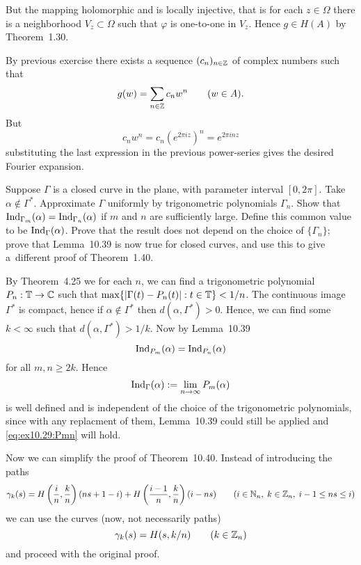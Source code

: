 \begin{enumerate}
But the mapping holomorphic and 
is locally injective, that is for each \(z\in\Omega\)
there is a neighborhood \(V_z\subset\Omega\) such that \(\varphi\)
is one-to-one in \(V_z\).
Hence \(g\in H(A)\) by Theorem~1.30.

By previous exercise there exists a sequence \((c_n)_{n\in\mathbb{Z}}\)
of complex numbers such that 
\begin{equation*}
g(w) = \sum_{n\in\mathbb{Z}} c_n w^n \qquad (w\in A).
\end{equation*}
But
\begin{equation*}
c_nw^n = c_n  \left(e^{2\pi i z}\right)^n = e^{2\pi i nz}
\end{equation*}
substituting the last expression in the previous power-series gives
the desired  Fourier expansion.


\begin{excopy}
Suppose \(\Gamma\) is a closed curve in the plane, with parameter interval
\([0,2\pi]\).
Take \mbox{\(\alpha \notin \Gamma^*\).}
Approximate \(\Gamma\) uniformly by trigonometric polynomials \(\Gamma_n\).
Show that \(\mathop{\rm Ind}\nolimits_{\Gamma_m}(\alpha) = \mathop{\rm Ind}\nolimits_{\Gamma_n}(\alpha)\) if $m$ and $n$
are sufficiently large. Define this common value to be \(\mathop{\rm Ind}\nolimits_{\Gamma}(\alpha)\).
Prove that the result does not depend on the choice of \(\{\Gamma_n\}\);
prove that Lemma~10.39 is now true for closed curves, and use this to give 
a~different proof of Theorem~1.40.
\end{excopy}

By Theorem~4.25 we for each $n$, we can find a trigonometric polynomial
\(P_n:\mathbb{T}\to\mathbb{C}\) such that \(\max\{|\Gamma(t)-P_n(t)|: t\in\mathbb{T}\}< 1/n\).
The continuous image \(\Gamma^*\) is compact, hence 
if \(\alpha\notin \Gamma^*\) then \(d(\alpha,\Gamma^*)>0\).
Hence, we can find some \(k<\infty\) such that \(d(\alpha,\Gamma^*)>1/k\).
Now by Lemma~10.39
\begin{equation} \label{eq:ex10.29:Pmn}
\mathop{\rm Ind}\nolimits_{P_m}(\alpha) = \mathop{\rm Ind}\nolimits_{P_n}(\alpha) 
\end{equation}
for all \(m, n \geq 2k\).
Hence 
\begin{equation*}
\mathop{\rm Ind}\nolimits_\Gamma(\alpha) := \lim_{n\to\infty}{P_m}(\alpha)
\end{equation*}
is well defined and is independent of the choice 
of the trigonometric polynomials, since with any replacment of them,
Lemma~10.39 could still be applied and \eqref{eq:ex10.29:Pmn} will hold.

Now we can simplify the proof of Theorem~10.40.
Instead of introducing the paths 
\begin{equation*}
\gamma_k(s) 
 = H\left(\frac{i}{n},\frac{k}{n}\right)(ns + 1 -i)
 + H\left(\frac{i-1}{n},\frac{k}{n}\right)(i - ns)
\qquad (i\in\mathbb{N}_n, \; k\in \mathbb{Z}_n, \; i-1\leq ns\leq i)
\end{equation*}
we can use the curves (now, not necessarily paths)
\begin{equation*}
\gamma_k(s) = H(s,k/n) \qquad (k\in \mathbb{Z}_n)
\end{equation*}
and proceed with the original proof.



\end{enumerate}
